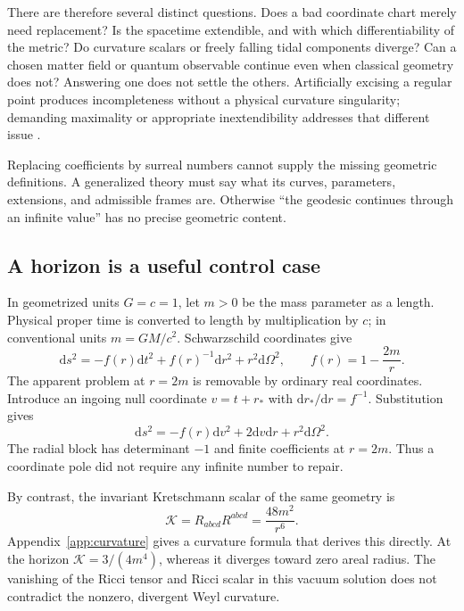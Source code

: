 \documentclass[11pt,a4paper]{article}
\numberwithin{equation}{section}
\theoremstyle{definition}
\theoremstyle{remark}
\newcommand{\dd}{\mathrm d}
\newcommand{\Krets}{\mathcal K}
\begin{document}
There are therefore several distinct questions. Does a bad coordinate chart merely need replacement? Is the spacetime extendible, and with which differentiability of the metric? Do curvature scalars or freely falling tidal components diverge? Can a chosen matter field or quantum observable continue even when classical geometry does not? Answering one does not settle the others. Artificially excising a regular point produces incompleteness without a physical curvature singularity; demanding maximality or appropriate inextendibility addresses that different issue \cite{Senovilla}.

Replacing coefficients by surreal numbers cannot supply the missing geometric definitions. A generalized theory must say what its curves, parameters, extensions, and admissible frames are. Otherwise ``the geodesic continues through an infinite value'' has no precise geometric content.

\subsection{A horizon is a useful control case}
In geometrized units $G=c=1$, let $m>0$ be the mass parameter as a length. Physical proper time is converted to length by multiplication by $c$; in conventional units $m=GM/c^2$. Schwarzschild coordinates give
\begin{equation}\label{eq:schwarzschild}
 \dd s^2=-f(r)\dd t^2+f(r)^{-1}\dd r^2+r^2\dd\Omega^2,
 \qquad f(r)=1-\frac{2m}{r}.
\end{equation}
The apparent problem at $r=2m$ is removable by ordinary real coordinates. Introduce an ingoing null coordinate $v=t+r_*$ with $\dd r_*/\dd r=f^{-1}$. Substitution gives
\begin{equation}\label{eq:ef}
 \dd s^2=-f(r)\dd v^2+2\dd v\dd r+r^2\dd\Omega^2.
\end{equation}
The radial block has determinant $-1$ and finite coefficients at $r=2m$. Thus a coordinate pole did not require any infinite number to repair.

By contrast, the invariant Kretschmann scalar of the same geometry is
\begin{equation}\label{eq:schwarzK}
 \Krets=R_{abcd}R^{abcd}=\frac{48m^2}{r^6}.
\end{equation}
Appendix~\ref{app:curvature} gives a curvature formula that derives this directly. At the horizon $\Krets=3/(4m^4)$, whereas it diverges toward zero areal radius. The vanishing of the Ricci tensor and Ricci scalar in this vacuum solution does not contradict the nonzero, divergent Weyl curvature.
\end{document}
